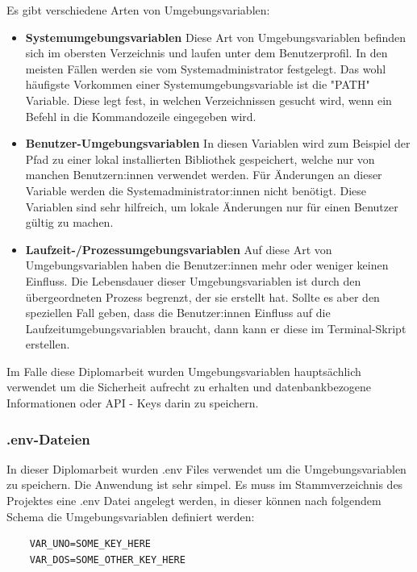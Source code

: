 Es gibt verschiedene Arten von Umgebungsvariablen:

\begin{itemize}
    \item \textbf{Systemumgebungsvariablen}
        \newline
        Diese Art von Umgebungsvariablen befinden sich im obersten Verzeichnis und laufen unter dem Benutzerprofil. In den meisten Fällen werden sie vom Systemadministrator festgelegt. Das wohl häufigste Vorkommen einer Systemumgebungsvariable ist die "PATH" Variable. Diese legt fest, in welchen Verzeichnissen gesucht wird, wenn ein Befehl in die Kommandozeile eingegeben wird.
        \cite{path_setzen}
        
    \item \textbf{Benutzer-Umgebungsvariablen}
        \newline
        In diesen Variablen wird zum Beispiel der Pfad zu einer lokal installierten Bibliothek gespeichert, welche nur von manchen Benutzern:innen verwendet werden. Für Änderungen an dieser Variable werden die Systemadministrator:innen nicht benötigt. Diese Variablen sind sehr hilfreich, um lokale Änderungen nur für einen Benutzer gültig zu machen.
    \item \textbf{Laufzeit-/Prozessumgebungsvariablen}
        \newline
        Auf diese Art von Umgebungsvariablen haben die Benutzer:innen mehr oder weniger keinen Einfluss. Die Lebensdauer dieser Umgebungsvariablen ist durch den übergeordneten Prozess begrenzt, der sie erstellt hat.
        Sollte es aber den speziellen Fall geben, dass die Benutzer:innen Einfluss auf die Laufzeitumgebungsvariablen braucht, dann kann er diese im Terminal-Skript erstellen.
\end{itemize}

Im Falle diese Diplomarbeit wurden Umgebungsvariablen hauptsächlich verwendet um die Sicherheit aufrecht zu erhalten und datenbankbezogene Informationen oder API - Keys darin zu speichern.

\subsubsection{.env-Dateien}
In dieser Diplomarbeit wurden .env Files verwendet um die Umgebungsvariablen zu speichern. Die Anwendung ist sehr simpel. Es muss im Stammverzeichnis des Projektes eine .env Datei angelegt werden, in dieser können nach folgendem Schema die Umgebungsvariablen definiert werden:
\begin{verbatim}
    VAR_UNO=SOME_KEY_HERE
    VAR_DOS=SOME_OTHER_KEY_HERE
\end{verbatim}

